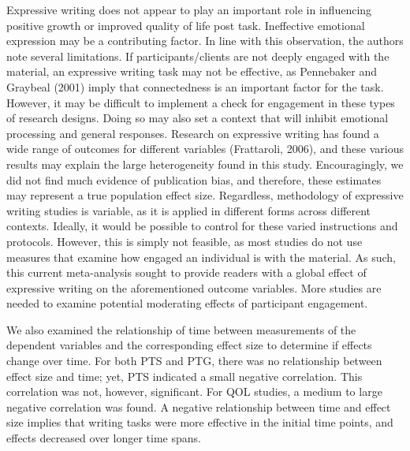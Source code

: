 \documentclass[english,man, mask]{apa6}
\newcounter{author}
\theoremstyle{definition}
\theoremstyle{definition}
\theoremstyle{definition}
\theoremstyle{remark}
\begin{document}
Expressive writing does not appear to play an important role in
influencing positive growth or improved quality of life post task.
Ineffective emotional expression may be a contributing factor. In line
with this observation, the authors note several limitations. If
participants/clients are not deeply engaged with the material, an
expressive writing task may not be effective, as Pennebaker and Graybeal
(2001) imply that connectedness is an important factor for the task.
However, it may be difficult to implement a check for engagement in
these types of research designs. Doing so may also set a context that
will inhibit emotional processing and general responses. Research on
expressive writing has found a wide range of outcomes for different
variables (Frattaroli, 2006), and these various results may explain the
large heterogeneity found in this study. Encouragingly, we did not find
much evidence of publication bias, and therefore, these estimates may
represent a true population effect size. Regardless, methodology of
expressive writing studies is variable, as it is applied in different
forms across different contexts. Ideally, it would be possible to
control for these varied instructions and protocols. However, this is
simply not feasible, as most studies do not use measures that examine
how engaged an individual is with the material. As such, this current
meta-analysis sought to provide readers with a global effect of
expressive writing on the aforementioned outcome variables. More studies
are needed to examine potential moderating effects of participant
engagement.

We also examined the relationship of time between measurements of the
dependent variables and the corresponding effect size to determine if
effects change over time. For both PTS and PTG, there was no
relationship between effect size and time; yet, PTS indicated a small
negative correlation. This correlation was not, however, significant.
For QOL studies, a medium to large negative correlation was found. A
negative relationship between time and effect size implies that writing
tasks were more effective in the initial time points, and effects
decreased over longer time spans.
\end{document}
